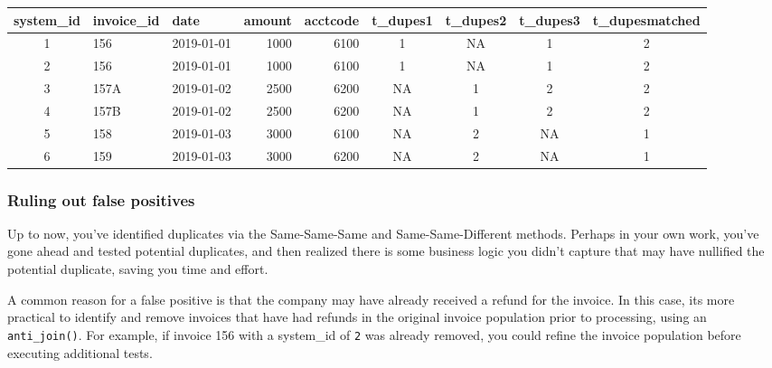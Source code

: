 \documentclass[
]{book}
\newenvironment{Shaded}{\begin{snugshade}}{\end{snugshade}}
\newcommand{\CommentTok}[1]{\textcolor[rgb]{0.56,0.35,0.01}{\textit{#1}}}
\newcommand{\DataTypeTok}[1]{\textcolor[rgb]{0.13,0.29,0.53}{#1}}
\newcommand{\DecValTok}[1]{\textcolor[rgb]{0.00,0.00,0.81}{#1}}
\newcommand{\KeywordTok}[1]{\textcolor[rgb]{0.13,0.29,0.53}{\textbf{#1}}}
\newcommand{\NormalTok}[1]{#1}
\newcommand{\OperatorTok}[1]{\textcolor[rgb]{0.81,0.36,0.00}{\textbf{#1}}}
\newcommand{\StringTok}[1]{\textcolor[rgb]{0.31,0.60,0.02}{#1}}
\begin{document}
\captionsetup[table]{labelformat=empty,skip=1pt}
\begin{longtable}{cllrrcccc}
\toprule
system\_id & invoice\_id & date & amount & acctcode & t\_dupes1 & t\_dupes2 & t\_dupes3 & t\_dupesmatched \\ 
\midrule
1 & 156 & 2019-01-01 & 1000 & 6100 & 1 & NA & 1 & 2 \\ 
2 & 156 & 2019-01-01 & 1000 & 6100 & 1 & NA & 1 & 2 \\ 
3 & 157A & 2019-01-02 & 2500 & 6200 & NA & 1 & 2 & 2 \\ 
4 & 157B & 2019-01-02 & 2500 & 6200 & NA & 1 & 2 & 2 \\ 
5 & 158 & 2019-01-03 & 3000 & 6100 & NA & 2 & NA & 1 \\ 
6 & 159 & 2019-01-03 & 3000 & 6200 & NA & 2 & NA & 1 \\ 
\bottomrule
\end{longtable}

\hypertarget{ruling-out-false-positives}{%
\subsubsection{Ruling out false positives}\label{ruling-out-false-positives}}

Up to now, you've identified duplicates via the Same-Same-Same and Same-Same-Different methods. Perhaps in your own work, you've gone ahead and tested potential duplicates, and then realized there is some business logic you didn't capture that may have nullified the potential duplicate, saving you time and effort.

A common reason for a false positive is that the company may have already received a refund for the invoice. In this case, its more practical to identify and remove invoices that have had refunds in the original invoice population prior to processing, using an \texttt{anti\_join()}. For example, if invoice 156 with a system\_id of \texttt{2} was already removed, you could refine the invoice population before executing additional tests.

\begin{Shaded}
\end{Shaded}
\end{document}

